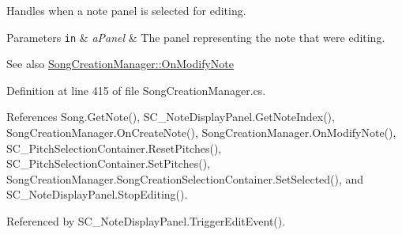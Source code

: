 Handles when a note panel is selected for editing. 


\begin{DoxyParams}[1]{Parameters}
\mbox{\tt in}  & {\em a\+Panel} & The panel representing the note that we\textquotesingle{}re editing.\\
\hline
\end{DoxyParams}
\begin{DoxySeeAlso}{See also}
\hyperlink{group___s_c_m_handlers_gaf12d6326ad2175a51f688504372be784}{Song\+Creation\+Manager\+::\+On\+Modify\+Note} 
\end{DoxySeeAlso}


Definition at line 415 of file Song\+Creation\+Manager.\+cs.



References Song.\+Get\+Note(), S\+C\+\_\+\+Note\+Display\+Panel.\+Get\+Note\+Index(), Song\+Creation\+Manager.\+On\+Create\+Note(), Song\+Creation\+Manager.\+On\+Modify\+Note(), S\+C\+\_\+\+Pitch\+Selection\+Container.\+Reset\+Pitches(), S\+C\+\_\+\+Pitch\+Selection\+Container.\+Set\+Pitches(), Song\+Creation\+Manager.\+Song\+Creation\+Selection\+Container.\+Set\+Selected(), and S\+C\+\_\+\+Note\+Display\+Panel.\+Stop\+Editing().



Referenced by S\+C\+\_\+\+Note\+Display\+Panel.\+Trigger\+Edit\+Event().


